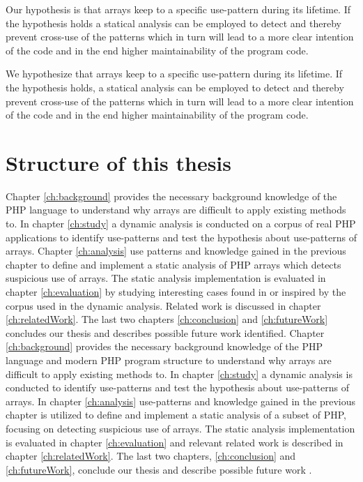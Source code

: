 Our hypothesis is that arrays keep to a specific use-pattern during its lifetime. If the hypothesis holds a statical analysis can be employed to detect and thereby prevent cross-use of the patterns which in turn will lead to a more clear intention of the code and in the end higher maintainability of the program code.


We hypothesize that arrays keep to a specific use-pattern during its lifetime. If the hypothesis holds, a statical analysis can be employed to detect and thereby prevent cross-use of the patterns which in turn will lead to a more clear intention of the code and in the end higher maintainability of the program code.


\section{Structure of this thesis}
Chapter \ref{ch:background} provides the necessary background knowledge of the PHP language to understand why arrays are difficult to apply existing methods to. In chapter \ref{ch:study} a dynamic analysis is conducted on a corpus of real PHP applications to identify use-patterns and test the hypothesis about use-patterns of arrays. Chapter \ref{ch:analysis} use patterns and knowledge gained in the previous chapter to define and implement a static analysis of PHP arrays which detects suspicious use of arrays. The static analysis implementation is evaluated in chapter \ref{ch:evaluation} by studying interesting cases found in or inspired by the corpus used in the dynamic analysis. Related work is discussed in chapter \ref{ch:relatedWork}. The last two chapters \ref{ch:conclusion} and \ref{ch:futureWork} concludes our thesis and describes possible future work identified.
Chapter \ref{ch:background} provides the necessary background knowledge of the PHP language and modern PHP program structure to understand why arrays are difficult to apply existing methods to. In chapter \ref{ch:study} a dynamic analysis is conducted to identify use-patterns and test the hypothesis about use-patterns of arrays. In chapter \ref{ch:analysis} use-patterns and knowledge gained in the previous chapter is utilized to define and implement a static analysis of a subset of PHP, focusing on detecting suspicious use of arrays. The static analysis implementation is evaluated in chapter \ref{ch:evaluation} and relevant related work is described in chapter \ref{ch:relatedWork}. The last two chapters, \ref{ch:conclusion} and \ref{ch:futureWork}, conclude our thesis and describe possible future work .